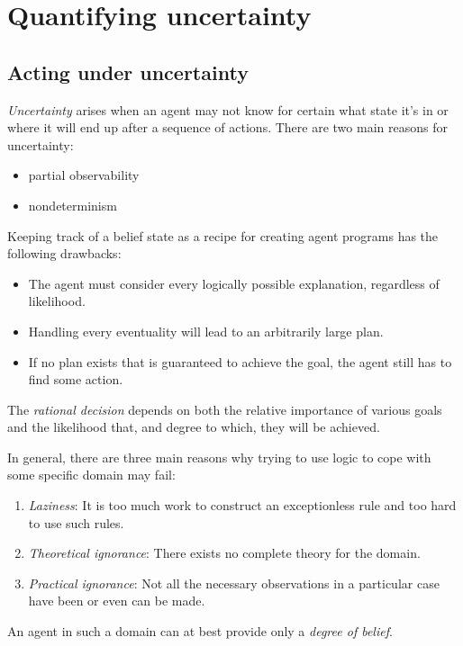 \documentclass{article}
\begin{document}
\section{Quantifying uncertainty}


\subsection{Acting under uncertainty}

\begin{definition}[R\&N p. 480]
	\emph{Uncertainty} arises when an agent may not know for certain what state
	it's in or where it will end up after a sequence of actions. There are
	two main reasons for uncertainty:
	\begin{itemize}
		\item partial observability
		\item nondeterminism
	\end{itemize}
\end{definition}

\begin{lemma}
	Keeping track of a belief state as a recipe for creating agent programs
	has the following drawbacks:
	\begin{itemize}
		\item The agent must consider every logically possible explanation, regardless of likelihood.
		\item Handling every eventuality will lead to an arbitrarily large plan.
		\item If no plan exists that is guaranteed to achieve the goal, the agent still has to find some action.
	\end{itemize}
\end{lemma}

\begin{definition}[R\&N p. 481]
	The \emph{rational decision} depends on both the relative importance of various goals and the
	likelihood that, and degree to which, they will be achieved.
\end{definition}

\begin{theorem}
	In general, there are three main reasons why trying to use logic
	to cope with some specific domain may fail:
	\begin{enumerate}
		\item \emph{Laziness}: It is too much work to construct an
		      exceptionless rule and too hard to use such rules.
		\item \emph{Theoretical ignorance}: There exists no complete theory for the domain.
		\item \emph{Practical ignorance}: Not all the necessary observations
		      in a particular case have been or even can be made.
	\end{enumerate}
	An agent in such a domain can at best provide only a \emph{degree of belief}.
\end{theorem}
\end{document}
